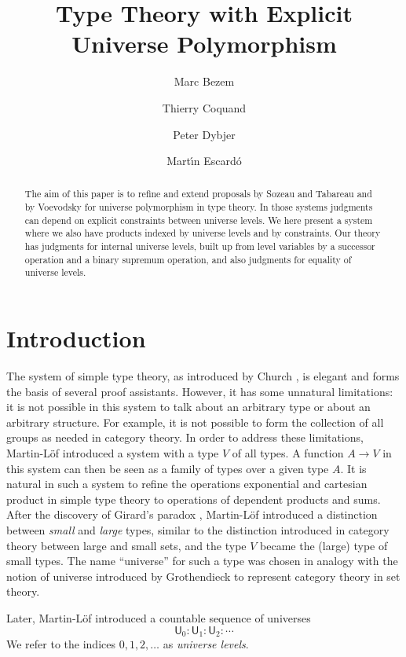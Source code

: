 \documentclass[a4paper,UKenglish,cleveref, autoref, thm-restate]{lipics-v2021}
\title{Type Theory with Explicit Universe Polymorphism} %
\author{Marc Bezem}{University of Bergen, Norway}{Marc.Bezem@uib.no}%
{https://orcid.org/0000-0002-7320-1976}{}
\author{Thierry Coquand}{University of Gothenburg, Sweden} {Thierry.Coquand@cse.gu.se}%
{https://orcid.org/0000-0002-5429-5153}{}
\author{Peter Dybjer}{Chalmers University of Technology, Sweden}{peterd@chalmers.se}{https://orcid.org/0000-0003-4043-5204}{}
\author{Mart\'{\i}n Escard\'o}{University of Birmingham, UK}{m.escardo@bham.ac.uk}{https://orcid.org/0000-0002-4091-6334}{}
\newcommand{\UU}{\mathsf{U}}
\begin{document}
\maketitle

\begin{abstract}
The aim of this paper is to refine and extend proposals by Sozeau and Tabareau and by Voevodsky for universe polymorphism in type theory. In those systems judgments can depend on explicit constraints between universe levels. We here present a system where we also have products indexed by universe levels and by constraints. Our theory has judgments for internal universe levels, built up from level variables by a successor operation and a binary supremum operation, and also judgments for equality of universe levels.
\end{abstract}

\section{Introduction}\label{sec:intro}

The system of simple type theory,
as introduced by Church \cite{church:formulation},
is elegant and forms the basis of several proof assistants.
However, it has some unnatural limitations:
it is not possible in this system to talk
about an arbitrary type or about an arbitrary structure.
For example, it is not possible to form the collection of all groups
as needed in category theory. In order to address these limitations,
Martin-L\"of \cite{ML71,ML71a} introduced a system with a type $V$ of all types.
A function $A\rightarrow V$ in this system can then be seen as a family of types
over a given type $A$. It is natural in such a system to refine
the operations exponential and cartesian product in simple type theory
to operations of dependent products and sums.
After the discovery of Girard's paradox \cite{Girard71},
Martin-L\"of \cite{ML72} introduced a distinction between
{\em small} and {\em large} types, similar to the distinction introduced
in category theory between large and small sets,
and the type $V$ became the (large) type of small types.
The name ``universe'' for such a type was chosen in analogy with the notion of
universe introduced by Grothendieck to represent category theory in set theory.

Later, Martin-L\"of \cite{martinlof:predicative} introduced a countable sequence of universes
$$
\UU_0 : \UU_1 : \UU_2 : \cdots
$$
We refer to the indices $0, 1, 2, \ldots$ as {\em universe levels}.
\end{document}
